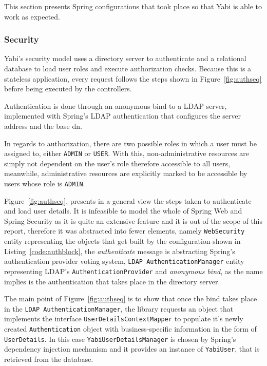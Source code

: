 This section presents Spring configurations that took place so that \gls{Yabi} is able to work as expected.

\subsubsection{Security}
\gls{Yabi}'s security model uses a directory server to authenticate and a relational database to load user roles and execute authorization checks. Because this is a stateless application, every request follows the steps shown in Figure~\ref{fig:authseq} before being executed by the controllers.

Authentication is done through an anonymous bind to a \gls{LDAP} server, implemented with Spring's \gls{LDAP} authentication that configures the server address and the base \gls{dn}.

In regards to authorization, there are two possible roles in which a user must be assigned to, either \texttt{ADMIN} or \texttt{USER}. With this, non-administrative resources are simply not dependent on the user's role therefore accessible to all users, meanwhile, administrative resources are explicitly marked to be accessible by users whose role is \texttt{ADMIN}.

Figure~\ref{fig:authseq}, presents in a general view the steps taken to authenticate and load user details. It is infeasible to model the whole of Spring Web and Spring Security as it is quite an extensive feature and it is out of the scope of this report, therefore it was abstracted into fewer elements, namely \texttt{WebSecurity} entity representing the objects that get built by the configuration shown in Listing~\ref{code:authblock}, the \textit{authenticate} message is abstracting Spring's authentication provider voting system, \texttt{LDAP AuthenticationManager} entity representing \gls{LDAP}'s \texttt{AuthenticationProvider} and \textit{anonymous bind}, as the name implies is the authentication that takes place in the directory server.

The main point of Figure~\ref{fig:authseq} is to show that once the bind takes place in the \texttt{LDAP AuthenticationManager}, the library requests an object that implements the interface \texttt{UserDetailsContextMapper} to populate it's newly created \texttt{Authentication} object with business-specific information in the form of \texttt{UserDetails}. In this case \texttt{YabiUserDetailsManager} is chosen by Spring's dependency injection mechanism and it provides an instance of \texttt{YabiUser}, that is retrieved from the database.

